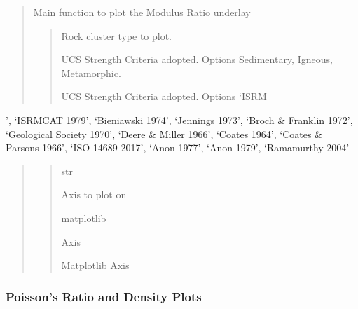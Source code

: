 \documentclass[letterpaper,10pt,english]{sphinxmanual}
\begin{document}
\begin{fulllineitems}
\begin{fulllineitems}
\begin{quote}
\sphinxAtStartPar
Main function to plot the Modulus Ratio underlay
\begin{quote}\begin{description}
\sphinxAtStartPar
Rock cluster type to plot.

\sphinxAtStartPar
UCS Strength Criteria adopted. Options Sedimentary, Igneous, Metamorphic.

\sphinxAtStartPar
UCS Strength Criteria adopted. Options ‘ISRM

\end{description}\end{quote}
\end{quote}

’, ‘ISRMCAT
1979’, ‘Bieniawski
1974’, ‘Jennings
1973’, ‘Broch \& Franklin
1972’, ‘Geological Society
1970’, ‘Deere \& Miller
1966’, ‘Coates
1964’, ‘Coates \& Parsons
1966’, ‘ISO 14689
2017’, ‘Anon
1977’, ‘Anon
1979’, ‘Ramamurthy
2004’
\begin{quote}
\begin{quote}\begin{description}
\sphinxAtStartPar
str

\sphinxAtStartPar
Axis to plot on

\sphinxAtStartPar
matplotlib

\sphinxAtStartPar
Axis

\sphinxAtStartPar
Matplotlib Axis

\end{description}\end{quote}
\end{quote}

\end{fulllineitems}


\end{fulllineitems}



\subsubsection{Poisson’s Ratio and Density Plots}
\label{\detokenize{pyrockmodulus:module-1}}\label{\detokenize{pyrockmodulus:poisson-s-ratio-and-density-plots}}
\end{document}
